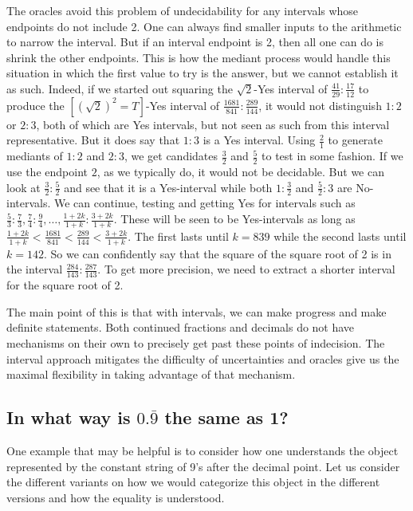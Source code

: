 \documentclass[12pt]{article}
\begin{document}
The oracles avoid this problem of undecidability for any intervals whose endpoints do not include 2. One can always find smaller inputs to the arithmetic to narrow the interval. But if an interval endpoint is 2, then all one can do is shrink the other endpoints. This is how the mediant process would handle this situation in which the first value to try is the answer, but we cannot establish it as such. Indeed, if we started out squaring the $\sqrt{2}$-Yes interval of $\frac{41}{29}:\frac{17}{12}$ to produce the $[(\sqrt{2})^2=T]$-Yes interval of $\frac{1681}{841}:\frac{289}{144}$, it would not distinguish $1:2$ or $2:3$, both of which are Yes intervals, but not seen as such from this interval representative. But it does say that $1:3$ is a Yes interval. Using $\frac{2}{1}$ to generate mediants of $1:2$ and $2:3$, we get candidates $\frac{3}{2}$ and $\frac{5}{2}$ to test in some fashion. If we use the endpoint $2$, as we typically do, it would not be decidable. But we can look at $\frac{3}{2}:\frac{5}{2}$ and see that it is a Yes-interval while both $1:\frac{3}{2}$ and $\frac{5}{2}:3$ are No-intervals. We can continue, testing and getting Yes for intervals such as $\frac{5}{3}:\frac{7}{3}, \frac{7}{4}:\frac{9}{4}, \ldots, \frac{1 + 2k}{1+k}:\frac{3+2k}{1+k}$. These will be seen to be Yes-intervals as long as $\frac{1+2k}{1+k} < \frac{1681}{841} < \frac{289}{144} < \frac{3+2k}{1+k}$. The first lasts until $k=839$ while the second lasts until $k=142$. So we can confidently say that the square of the square root of 2 is in the interval $\frac{284}{143}:\frac{287}{143}$. To get more precision, we need to extract a shorter interval for the square root of 2. 

The main point of this is that with intervals, we can make progress and make definite statements. Both continued fractions and decimals do not have mechanisms on their own to precisely get past these points of indecision. The interval approach mitigates the difficulty of uncertainties and oracles give us the maximal flexibility in taking advantage of that mechanism.


\subsection{ In what way is \texorpdfstring{$0.\bar{9}$}{0.9} the same as 1?}

One example that may be helpful is to consider how one understands the object represented by the constant string of 9's after the decimal point. Let us consider the different variants on how we would categorize this object in the different versions and how the equality is understood. 
\end{document}
